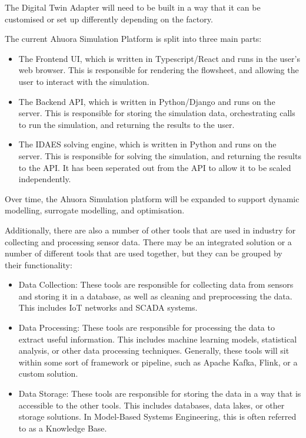 The Digital Twin Adapter will need to be built in a way that it can be customised or set up differently depending on the factory. 

The current Ahuora Simulation Platform is split into three main parts:

\begin{itemize}
    \item The Frontend UI, which is written in Typescript/React and runs in the user's web browser. This is responsible for rendering the flowsheet, and allowing the user to interact with the simulation.
    \item The Backend API, which is written in Python/Django and runs on the server. This is responsible for storing the simulation data, orchestrating calls to run the simulation, and returning the results to the user.
    \item The IDAES solving engine, which is written in Python and runs on the server. This is responsible for solving the simulation, and returning the results to the API. It has been seperated out from the API to allow it to be scaled independently.
\end{itemize}

Over time, the Ahuora Simulation platform will be expanded to support dynamic modelling, surrogate modelling, and optimisation.

Additionally, there are also a number of other tools that are used in industry for collecting and processing sensor data. There may be an integrated solution or a number of different tools that are used together, but they can be grouped by their functionality:
\begin{itemize}
    \item Data Collection: These tools are responsible for collecting data from sensors and storing it in a database, as well as cleaning and preprocessing the data. This includes IoT networks and SCADA systems.
    \item Data Processing: These tools are responsible for processing the data to extract useful information. This includes machine learning models, statistical analysis, or other data processing techniques. Generally, these tools will sit within some sort of framework or pipeline, such as Apache Kafka, Flink, or a custom solution.
    \item Data Storage: These tools are responsible for storing the data in a way that is accessible to the other tools. This includes databases, data lakes, or other storage solutions. In Model-Based Systems Engineering, this is often referred to as a Knowledge Base.
\end{itemize}

